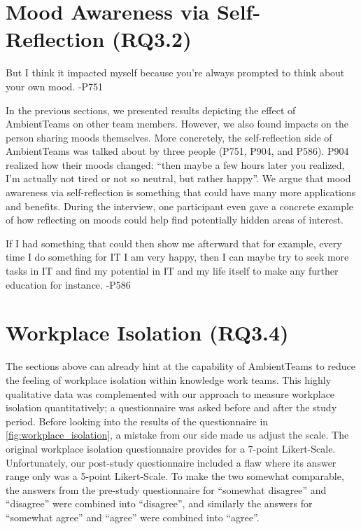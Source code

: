 
\section{Mood Awareness via Self-Reflection (RQ3.2)}

\begin{displayquote}
    But I think it impacted myself because you're always prompted to think about your own mood. -P751
\end{displayquote}

In the previous sections, we presented results depicting the effect of AmbientTeams on other team members. However, we also found impacts on the person sharing moods themselves. More concretely, the self-reflection side of AmbientTeams was talked about by three people (P751, P904, and P586). P904 realized how their moods changed: \enquote{then maybe a few hours later you realized, I'm actually not tired or not so neutral, but rather happy}. We argue that mood awareness via self-reflection is something that could have many more applications and benefits. During the interview, one participant even gave a concrete example of how reflecting on moods could help find potentially hidden areas of interest.

\begin{displayquote}
    If I had something that could then show me afterward that for example, every time I do something for IT I am very happy, then I can maybe try to seek more tasks in IT and find my potential in IT and my life itself to make any further education for instance. -P586
\end{displayquote}

\section{Workplace Isolation (RQ3.4)}
\label{section:workplace_isolation}

The sections above can already hint at the capability of AmbientTeams to reduce the feeling of workplace isolation within knowledge work teams. This highly qualitative data was complemented with our approach to measure workplace isolation quantitatively; a questionnaire was asked before and after the study period. Before looking into the results of the questionnaire in \autoref{fig:workplace_isolation}, a mistake from our side made us adjust the scale. The original workplace isolation questionnaire provides for a 7-point Likert-Scale. Unfortunately, our post-study questionnaire included a flaw where its answer range only was a 5-point Likert-Scale. To make the two somewhat comparable, the answers from the pre-study questionnaire for \enquote{somewhat disagree} and \enquote{disagree} were combined into \enquote{disagree}, and similarly the answers for \enquote{somewhat agree} and \enquote{agree} were combined into \enquote{agree}.

